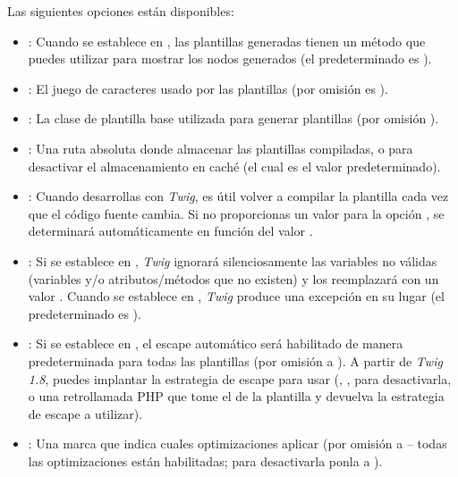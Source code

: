\documentclass[letterpaper,10pt,spanish]{sphinxmanual}
\begin{document}
Las siguientes opciones están disponibles:
\begin{itemize}
\item {} 
: Cuando se establece en , las plantillas generadas tienen un método  que puedes utilizar para mostrar los nodos generados (el predeterminado es ).

\item {} 
: El juego de caracteres usado por las plantillas (por omisión es ).

\item {} 
: La clase de plantilla base utilizada para generar plantillas (por omisión ).

\item {} 
: Una ruta absoluta donde almacenar las plantillas compiladas, o  para desactivar el almacenamiento en caché (el cual es el valor predeterminado).

\item {} 
: Cuando desarrollas con \emph{Twig}, es útil volver a compilar la plantilla cada vez que el código fuente cambia. Si no proporcionas un valor para la opción , se determinará automáticamente en función del valor .

\item {} 
: Si se establece en , \emph{Twig} ignorará silenciosamente las variables no válidas (variables y/o atributos/métodos que no existen) y los reemplazará con un valor . Cuando se establece en , \emph{Twig} produce una excepción en su lugar (el predeterminado es ).

\item {} 
: Si se establece en , el escape automático será habilitado de manera predeterminada para todas las plantillas (por omisión a ). A partir de \emph{Twig 1.8}, puedes implantar la estrategia de escape para usar (, ,  para desactivarla, o una retrollamada PHP que tome el  de la plantilla y devuelva la estrategia de escape a utilizar).

\item {} 
: Una marca que indica cuales optimizaciones aplicar (por omisión a  -- todas las optimizaciones están habilitadas; para desactivarla ponla a ).

\end{itemize}
\end{document}
